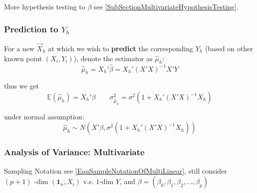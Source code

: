 \noindent More hypethesis testing to $ \beta  $ see \autoref{SubSectionMultivariateHypothesisTesting}.



\subsubsection{Prediction to $ Y_h $}
    For a new $ \vec{X}_h $ at which we wish to \textbf{predict }the corresponding $ Y_h $ (based on other known point $ (X_i,Y_i) $), denote the estimator as $ \hat{\mu}_h $:
    \begin{equation}
        \hat{\mu }_h=X_h'\hat{\beta }=X_h'(X'X)^{-1}X'Y
    \end{equation}
    
    thus we get 
    \begin{equation}
        \mathbb{E}(\hat{\mu }_h)= X_h'\beta  \qquad \sigma ^2_{\hat{\mu}_h}=\sigma ^2(1+X_h'(X'X)^{-1}X_h)
    \end{equation}

    under normal assumption:
    \begin{equation}
        \hat{\mu}_h\sim N(X'\beta,\sigma ^2(1+X_h'(X'X)^{-1}X_h))
    \end{equation}
    
    
    
    
    

    

\subsubsection{Analysis of Variance: Multivariate}
    Sampling Notation see \autoref{EqaSampleNotationOfMultiLinear}, still consider $ (p+1) $ -dim $ (\mathbf{1}_n,X_i) $ v.s. $ 1 $-dim $ Y $, and $ \beta=(\beta _0,\beta _1,\beta _2,\ldots,\beta _p) $

